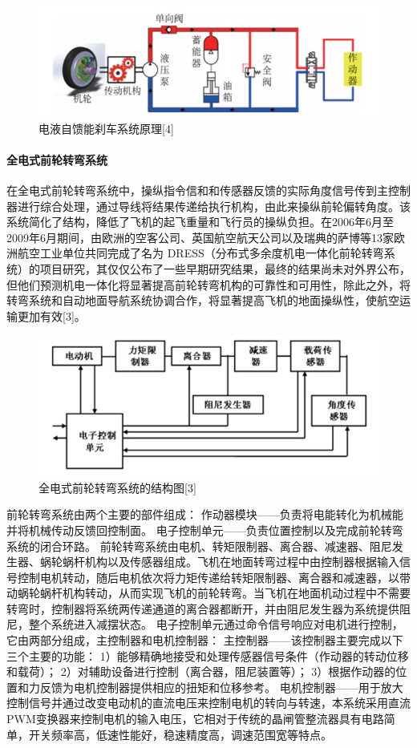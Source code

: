 \documentclass[12pt,a4paper]{report}
\begin{document}
\begin{figure}[htp]
\centering
   \includegraphics[width=.8\textwidth]{hybridbrake.jpg}
    \caption{电液自馈能刹车系统原理[4]}
    \label{fig:hybridbrake}
\end{figure}

\paragraph{全电式前轮转弯系统}
在全电式前轮转弯系统中，操纵指令信和和传感器反馈的实际角度信号传到主控制器进行综合处理，通过导线将结果传递给执行机构，由此来操纵前轮偏转角度。该系统简化了结构，降低了飞机的起飞重量和飞行员的操纵负担。在2006年6月至2009年6月期间，由欧洲的空客公司、英国航空航天公司以及瑞典的萨博等13家欧洲航空工业单位共同完成了名为 DRESS（分布式多余度机电一体化前轮转弯系统）的项目研究，其仅仅公布了一些早期研究结果，最终的结果尚未对外界公布，但他们预测机电一体化将显著提高前轮转弯机构的可靠性和可用性，除此之外，将转弯系统和自动地面导航系统协调合作，将显著提高飞机的地面操纵性，使航空运输更加有效[3]。

\begin{figure}[htp]
\centering
   \includegraphics[width=.8\textwidth]{nosegearelectric.jpg}
    \caption{全电式前轮转弯系统的结构图[3]}
    \label{fig:noseelectric}
\end{figure}

前轮转弯系统由两个主要的部件组成：
作动器模块——负责将电能转化为机械能并将机械传动反馈回控制面。
电子控制单元——负责位置控制以及完成前轮转弯系统的闭合环路。
前轮转弯系统由电机、转矩限制器、离合器、减速器、阻尼发生器、蜗轮蜗杆机构以及传感器组成。飞机在地面转弯过程中由控制器根据输入信号控制电机转动，随后电机依次将力矩传递给转矩限制器、离合器和减速器，以带动蜗轮蜗杆机构转动，从而实现飞机的前轮转弯。当飞机在地面机动过程中不需要转弯时，控制器将系统两传递通道的离合器都断开，并由阻尼发生器为系统提供阻尼，整个系统进入减摆状态。
电子控制单元通过命令信号响应对电机进行控制，它由两部分组成，主控制器和电机控制器：
主控制器——该控制器主要完成以下三个主要的功能：
1）能够精确地接受和处理传感器信号条件（作动器的转动位移和载荷）；
2）对辅助设备进行控制（离合器，阻尼装置等）；
3）根据作动器的位置和力反馈为电机控制器提供相应的扭矩和位移参考。
电机控制器——用于放大控制信号并通过改变电动机的直流电压来控制电机的转向与转速，本系统采用直流PWM变换器来控制电机的输入电压，它相对于传统的晶闸管整流器具有电路简单，开关频率高，低速性能好，稳速精度高，调速范围宽等特点。
\end{document}
